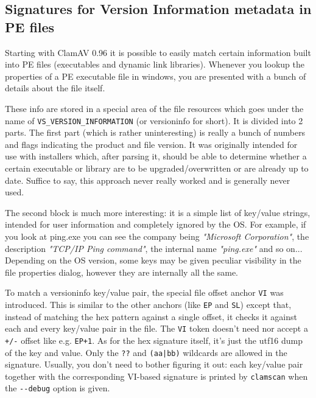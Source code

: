 \documentclass[a4paper,titlepage,12pt]{article}
\begin{document}
    \subsection{Signatures for Version Information metadata in PE files}
    Starting with ClamAV 0.96 it is possible to easily match certain
    information built into PE files (executables and dynamic link libraries).
    Whenever you lookup the properties of a PE executable file in windows,
    you are presented with a bunch of details about the file itself.

    These info are stored in a special area of the file resources which goes
    under the name of \verb+VS_VERSION_INFORMATION+ (or versioninfo for short).
    It is divided into 2 parts. The first part (which is rather uninteresting)
    is really a bunch of numbers and flags indicating the product and file
    version. It was originally intended for use with installers which, after
    parsing it, should be able to determine whether a certain executable or
    library are to be upgraded/overwritten or are already up to date. Suffice
    to say, this approach never really worked and is generally never used.

    The second block is much more interesting: it is a simple list of key/value
    strings, intended for user information and completely ignored by the OS.
    For example, if you look at ping.exe you can see the company being \emph{"Microsoft
    Corporation"}, the description \emph{"TCP/IP Ping command"}, the internal name
    \emph{"ping.exe"} and so on... Depending on the OS version, some keys may be given
    peculiar visibility in the file properties dialog, however they are internally
    all the same.

    To match a versioninfo key/value pair, the special file offset anchor \verb+VI+ was
    introduced.  This is similar to the other anchors (like \verb+EP+ and \verb+SL+)
    except that, instead of matching the hex pattern against a single offset, it checks
    it against each and every key/value pair in the file. The \verb+VI+ token doesn't
    need nor accept a \verb#+/-# offset like e.g. \verb#EP+1#. As for the hex signature
    itself, it's just the utf16 dump of the key and value. Only the \verb+??+ and
    \verb+(aa|bb)+ wildcards are allowed in the signature. Usually, you don't need to
    bother figuring it out: each key/value pair together with the corresponding VI-based
    signature is printed by \verb+clamscan+ when the \verb+--debug+ option is given.
\end{document}
